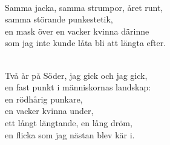 \begin{lyrics}
\\
Samma jacka, samma strumpor, året runt,\\
samma störande punkestetik,\\
en mask över en vacker kvinna därinne\\
som jag inte kunde låta bli att längta efter.

\\
Två år på Söder, jag gick och jag gick,\\
en fast punkt i människornas landskap:\\
en rödhårig punkare,\\
en vacker kvinna under,\\
ett långt längtande, en lång dröm,\\
en flicka som jag nästan blev kär i.
\end{lyrics}

